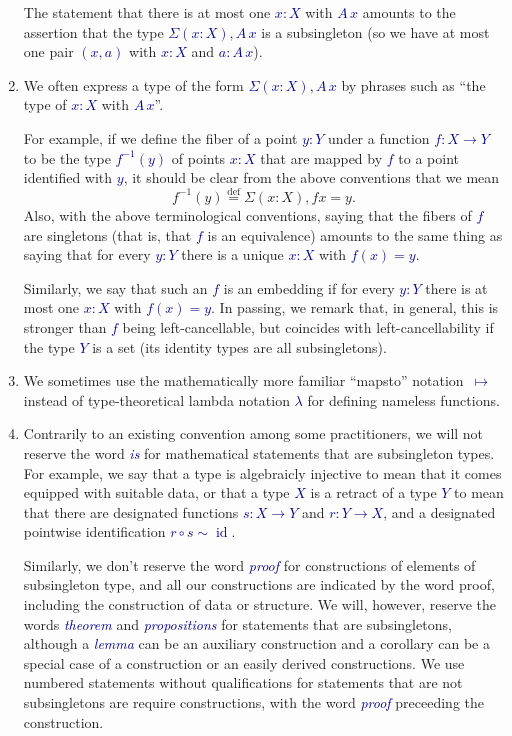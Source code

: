 \documentclass[10pt]{article}
\newcommand{\db}{\textcolor{darkblue}}
\newcommand{\df}[1]{\emph{\db{#1}}}
\newcommand{\m}[1]{\db{$#1$}}
\newcommand{\id}{\operatorname{id}}
\newcommand{\comp}{\mathrel{\circ}}
\newcommand{\eqdef}{\overset{\text{def}}{=}}
\theoremstyle{definition}
\begin{document}
\begin{enumerate}
  The statement that there is at most one \m{x:X} with \m{A \, x}
  amounts to the assertion that the type \m{\Sigma (x:X), A \, x} is a
  subsingleton (so we have at most one pair \m{(x,a)} with \m{x:X} and
  \m{a : A\, x}).

\item We often express a type of the form \m{\Sigma(x:X), A \, x} by
  phrases such as ``the type of \m{x:X} with \m{A \, x}''.

  For example, if we define the fiber of a point \m{y:Y} under a
  function \m{f : X \to Y} to be the type \m{f^{-1}(y)} of points \m{x:X}
  that are mapped by \m{f} to a point identified with \m{y}, it
  should be clear from the above conventions that we mean
  \[
   f^{-1}(y) \eqdef \Sigma (x : X), f x = y.
 \]
 Also, with the above terminological conventions, saying that the
 fibers of \m{f} are singletons (that is, that \m{f} is an equivalence)
 amounts to the same thing as saying that for every \m{y:Y} there is a
 unique \m{x:X} with \m{f(x)=y}.

 Similarly, we say that such an \m{f} is an embedding if for every
 \m{y:Y} there is at most one \m{x:X} with \m{f(x)=y}. In passing, we
 remark that, in general, this is stronger than \m{f} being
 left-cancellable, but coincides with left-cancellability if the type
 \m{Y} is a set (its identity types are all subsingletons).

\item We sometimes use the mathematically more familiar ``mapsto''
  notation~\m{\mapsto} instead of type-theoretical lambda notation
  \m{\lambda} for defining nameless functions.

\item Contrarily to an existing convention among some practitioners,
  we will not reserve the word \df{is} for mathematical statements
  that are subsingleton types. For example, we say that a type is
  algebraicly injective to mean that it comes equipped with suitable
  data, or that a type \m{X} is a retract of a type \m{Y} to mean that
  there are designated functions \m{s : X \to Y} and \m{r : Y \to X},
  and a designated pointwise identification \m{r \comp s \sim \id}.

  Similarly, we don't reserve the word \df{proof} for constructions of
  elements of subsingleton type, and all our constructions are
  indicated by the word proof, including the construction of data or
  structure.  We will, however, reserve the words \df{theorem} and
  \df{propositions} for statements that are subsingletons, although a
  \df{lemma} can be an auxiliary construction and a corollary can be a
  special case of a construction or an easily derived
  constructions. We use numbered statements without qualifications for
  statements that are not subsingletons are require constructions,
  with the word \df{proof} preceeding the construction.


\end{enumerate}
\end{document}
